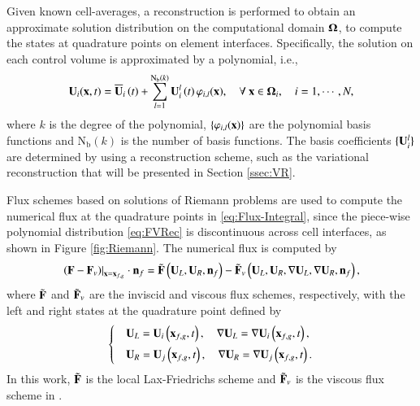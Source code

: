 Given known cell-averages, a reconstruction is performed to obtain an approximate solution distribution on the computational domain $\mathbf{\Omega}$, to compute the states at quadrature points on element interfaces. Specifically, the solution on each control volume is approximated by a polynomial, i.e.,
\begin{equation}
    \label{eq:FVRec}
    \mathbf{U}_i(\mathbf{x},t) = \overline{\mathbf{U}}_i \left(t\right) + \sum_{l=1}^{\mathrm{N_b}(k)}{\mathbf{U}_i^l \left(t\right) \varphi_{i,l}(\mathbf{x}) }, \quad \forall \ \mathbf{x} \in \mathbf{\Omega}_i, \quad i=1, \cdots, N,
\end{equation}
where $k$ is the degree of the polynomial, $\{\varphi_{i,l}(\mathbf{x})\}$ are the polynomial basis functions and $\mathrm{N_b}(k)$ is the number of basis functions. The basis coefficients $\{\mathbf{U}^l_i\}$ are determined by using a reconstruction scheme, such as the variational reconstruction \cite{wang2017compact_VR} that will be presented in Section \ref{ssec:VR}.

Flux schemes based on solutions of Riemann problems are used to compute the numerical flux at the quadrature points in \eqref{eq:Flux-Integral}, since the piece-wise polynomial distribution \eqref{eq:FVRec} is discontinuous across cell interfaces, as shown in Figure \ref{fig:Riemann}.
The numerical flux is computed by
\begin{equation}
    \label{eq:num-flux}
    \left. \left(\mathbf{F} - \mathbf{F}_v \right)\right|_{\mathbf{x}=\mathbf{x}_{f,g}} \cdot \mathbf{n}_f= \tilde{\mathbf{F}} \left(\mathbf{U}_L, \mathbf{U}_R,\mathbf{n}_f\right)- \tilde{\mathbf{F}}_v \left(\mathbf{U}_L, \mathbf{U}_R, \nabla \mathbf{U}_L, \nabla \mathbf{U}_R, \mathbf{n}_f\right),
\end{equation}
where $\tilde{\mathbf{F}}$ and $\tilde{\mathbf{F}}_v$ are the inviscid and viscous flux schemes, respectively, with the left and right states at the quadrature point defined by
\begin{equation}
    \begin{dcases}
         & \mathbf{U}_L= \mathbf{U}_i\left(\mathbf{x}_{f,g},t \right), \quad \nabla \mathbf{U}_L= \nabla \mathbf{U}_i\left(\mathbf{x}_{f,g},t \right),\\
         & \mathbf{U}_R= \mathbf{U}_j\left(\mathbf{x}_{f,g} ,t \right), \quad \nabla \mathbf{U}_R= \nabla \mathbf{U}_j\left(\mathbf{x}_{f,g},t \right).
    \end{dcases}
\end{equation}
In this work, $\tilde{\mathbf{F}}$ is the local Lax-Friedrichs scheme and $\tilde{\mathbf{F}}_v$ is the viscous flux scheme in \cite{wang2017compact_VR}.

